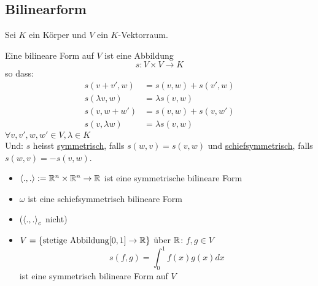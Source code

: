 \subsection{Bilinearform}
Sei $K$ ein Körper und $V$ ein $K$-Vektorraum.
\begin{Def}[Bilinearform]
  Eine bilineare Form auf $V$ ist eine Abbildung
  \[s:V\times V\to K\]
  so dass:
  \begin{align*}
    s(v+v',w)&=s(v,w)+s(v',w)\\
    s(\lambda v,w)&=\lambda s(v,w)\\
    s(v,w+w')&=s(v,w)+s(v,w')\\
    s(v,\lambda w)&= \lambda s(v,w)
  \end{align*}
  $\forall v,v',w,w'\in V, \lambda \in K$\\
  Und: $s$ heisst \underline{symmetrisch}, falls $s(w,v)=s(v,w)$ und \underline{schiefsymmetrisch}, falls $s(w,v)=-s(v,w)$.
\end{Def}
\begin{Bsp}
  \begin{itemize}
    \item $\left\langle .,. \right\rangle:=\mathbb{R}^n\times \mathbb{R}^n\to\mathbb{R}$ ist eine symmetrische bilineare Form
    \item $\omega$ ist eine schiefsymmetrisch bilineare Form
    \item ($\left\langle .,. \right\rangle_c$ nicht)
    \item $V=\{\text{stetige Abbildung} [0,1] \to\mathbb{R}\}$ über $\mathbb{R}$: $f,g\in V$
      \[s(f,g)=\int^1_0 f(x)g(x)dx\]
      ist eine symmetrisch bilineare Form auf $V$
  \end{itemize}
\end{Bsp}
